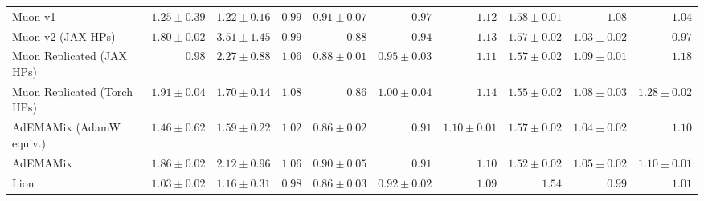 \begin{table}[htbp]
{\begin{tabular}{lrrrrrrrrr}
Muon v1 & $1.25 \pm 0.39$ & $1.22 \pm 0.16$ & $0.99$ & $0.91 \pm 0.07$ & $0.97$ & $1.12$ & $1.58 \pm 0.01$ & $1.08$ & $1.04$ \\
Muon v2 (JAX HPs) & $1.80 \pm 0.02$ & $3.51 \pm 1.45$ & $0.99$ & $0.88$ & $0.94$ & $1.13$ & $1.57 \pm 0.02$ & $1.03 \pm 0.02$ & $0.97$ \\
Muon Replicated (JAX HPs) & $0.98$ & $2.27 \pm 0.88$ & $1.06$ & $0.88 \pm 0.01$ & $0.95 \pm 0.03$ & $1.11$ & $1.57 \pm 0.02$ & $1.09 \pm 0.01$ & $1.18$ \\
Muon Replicated (Torch HPs) & $1.91 \pm 0.04$ & $1.70 \pm 0.14$ & $1.08$ & $0.86$ & $1.00 \pm 0.04$ & $1.14$ & $1.55 \pm 0.02$ & $1.08 \pm 0.03$ & $1.28 \pm 0.02$ \\
AdEMAMix (AdamW equiv.) & $1.46 \pm 0.62$ & $1.59 \pm 0.22$ & $1.02$ & $0.86 \pm 0.02$ & $0.91$ & $1.10 \pm 0.01$ & $1.57 \pm 0.02$ & $1.04 \pm 0.02$ & $1.10$ \\
AdEMAMix & $1.86 \pm 0.02$ & $2.12 \pm 0.96$ & $1.06$ & $0.90 \pm 0.05$ & $0.91$ & $1.10$ & $1.52 \pm 0.02$ & $1.05 \pm 0.02$ & $1.10 \pm 0.01$ \\
Lion & $1.03 \pm 0.02$ & $1.16 \pm 0.31$ & $0.98$ & $0.86 \pm 0.03$ & $0.92 \pm 0.02$ & $1.09$ & $1.54$ & $0.99$ & $1.01$ \\
\bottomrule
\end{tabular}%
}
\end{table}
